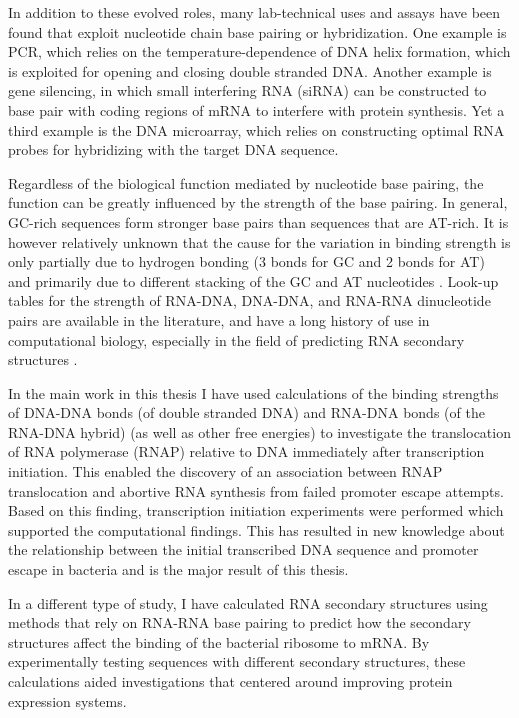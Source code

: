 In addition to these evolved roles, many lab-technical uses and assays have
been found that exploit nucleotide chain base pairing or hybridization. One
example is PCR, which relies on the temperature-dependence of DNA helix
formation, which is exploited for opening and closing double stranded DNA.
Another example is gene silencing, in which small interfering RNA (siRNA) can
be constructed to base pair with coding regions of mRNA to interfere with
protein synthesis. Yet a third example is the DNA microarray, which relies on
constructing optimal RNA probes for hybridizing with the target DNA sequence.

Regardless of the biological function mediated by nucleotide base pairing, the
function can be greatly influenced by the strength of the base pairing. In
general, GC-rich sequences form stronger base pairs than sequences that
are AT-rich. It is however relatively unknown that the cause for the variation
in binding strength is only partially due to hydrogen bonding (3 bonds for GC
and 2 bonds for AT) and primarily due to different stacking of the GC and AT
nucleotides \cite{yakovchuk_base-stacking_2006}. Look-up tables for the
strength of RNA-DNA, DNA-DNA, and RNA-RNA dinucleotide pairs are available in
the literature, and have a long history of use in computational biology,
especially in the field of predicting RNA secondary structures
\cite{mathews_prediction_2006}.

In the main work in this thesis I have used calculations of the binding
strengths of DNA-DNA bonds (of double stranded DNA) and RNA-DNA bonds (of the
RNA-DNA hybrid) (as well as other free energies) to investigate the
translocation of RNA polymerase (RNAP) relative to DNA immediately after
transcription initiation. This enabled the discovery of an association between
RNAP translocation and abortive RNA synthesis from failed promoter escape
attempts. Based on this finding, transcription initiation experiments were
performed which supported the computational findings. This has resulted in new
knowledge about the relationship between the initial transcribed DNA sequence
and promoter escape in bacteria and is the major result of this thesis.

In a different type of study, I have calculated RNA secondary structures using
methods that rely on RNA-RNA base pairing to predict how the secondary
structures affect the binding of the bacterial ribosome to mRNA. By
experimentally testing sequences with different secondary structures, these
calculations aided investigations that centered around improving protein
expression systems.

